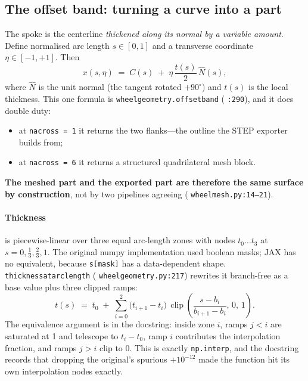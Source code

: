 \documentclass[11pt,a4paper]{article}
\DeclareRobustCommand{\code}[1]{%
  \texttt{\small\def\_{\textunderscore\discretionary{}{}{}}#1}}
\newcommand{\at}[2]{\code{#1:#2}}
\begin{document}
\subsection{The offset band: turning a curve into a part}
\label{sec:band}

The spoke is the centerline \emph{thickened along its normal by a variable amount}.
Define normalised arc length $s \in [0,1]$ and a transverse coordinate
$\eta \in [-1,+1]$. Then
%
\begin{equation}
  x(s,\eta) \;=\; C(s) \;+\; \eta\,\frac{t(s)}{2}\,\hat{N}(s),
  \label{eq:offsetband}
\end{equation}
%
where $\hat N$ is the unit normal (the tangent rotated $+90^\circ$) and $t(s)$ is the
local thickness. This one formula is \code{wheel\_geometry.offset\_band}
(\code{:290}), and it does double duty:

\begin{itemize}
\item at \code{n\_across = 1} it returns the two flanks---the outline the STEP exporter
  builds from;
\item at \code{n\_across = 6} it returns a structured quadrilateral mesh block.
\end{itemize}

\textbf{The meshed part and the exported part are therefore the same surface by
construction}, not by two pipelines agreeing (\at{wheel\_mesh.py}{14--21}).

\paragraph{Thickness} is piecewise-linear over three equal arc-length zones with nodes
$t_0 \ldots t_3$ at $s = 0, \tfrac13, \tfrac23, 1$. The original numpy implementation
used boolean masks; JAX has no equivalent, because \code{s[mask]} has a data-dependent
shape. \code{thickness\_at\_arc\_length} (\at{wheel\_geometry.py}{217}) rewrites it
branch-free as a base value plus three clipped ramps:
%
\begin{equation}
  t(s) \;=\; t_0 \;+\; \sum_{i=0}^{2} \bigl(t_{i+1} - t_i\bigr)\,
             \operatorname{clip}\!\left(\frac{s - b_i}{b_{i+1} - b_i},\,0,\,1\right).
  \label{eq:taper}
\end{equation}
%
The equivalence argument is in the docstring: inside zone $i$, ramps $j < i$ are
saturated at 1 and telescope to $t_i - t_0$, ramp $i$ contributes the interpolation
fraction, and ramps $j > i$ clip to 0. This is exactly \code{np.interp}, and the
docstring records that dropping the original's spurious $+10^{-12}$ made the function
hit its own interpolation nodes exactly.
\end{document}
